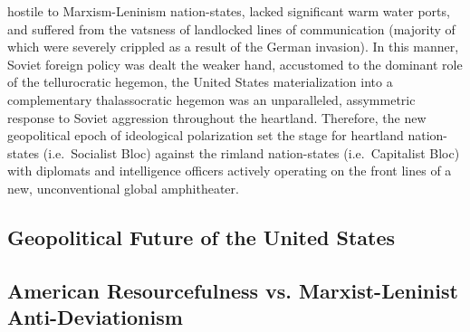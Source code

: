 \documentclass[12pt]{article}
\begin{document}
hostile to Marxism-Leninism nation-states, lacked significant warm water ports, and suffered from the vatsness of landlocked lines of communication (majority of which were severely crippled as a result of the German invasion). In this manner, Soviet foreign policy was dealt the weaker hand, accustomed to the dominant role of the tellurocratic hegemon, the United States materialization into a complementary thalassocratic hegemon was an unparalleled, assymmetric response to Soviet aggression throughout the heartland. Therefore, the new geopolitical epoch of ideological polarization set the stage for heartland nation-states (i.e.\ Socialist Bloc) against the rimland nation-states (i.e.\ Capitalist Bloc) with diplomats and intelligence officers actively operating on the front lines of a new, unconventional global amphitheater.
\begin{center}
  \section{Geopolitical Future of the United States}
\end{center}
\begin{center}
\subsection{American Resourcefulness vs. Marxist-Leninist Anti-Deviationism}
\end{center}
\end{document}
